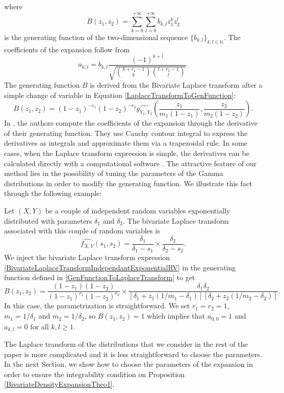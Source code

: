 where
\begin{equation}\label{CoefficientGeneratingFunction}
B(z_{1},z_{2})=\sum_{k=0}^{+\infty}\sum_{l=0}^{+\infty}b_{k,l}z_{1}^{k}z_{2}^{l}
\end{equation}
is the generating function of the two-dimensional sequence $\{b_{k,l}\}_{k,l\in\mathbb{N}}$. The coefficients of the expansion follow from 
\begin{equation}
a_{k,l}=b_{k,l}\frac{(-1)^{k+l}}{\sqrt{\binom{k+r_{1}-1}{k}\binom{l+r_{2}-1}{l}}}.
\end{equation}
The generating function $B$ is derived from the Bivariate Laplace transform after a simple change of variable in Equation \eqref{LaplaceTransformToGenFunction}:
\begin{equation}\label{GenFunctionToLaplaceTransform}
B(z_{1},z_{2})=(1-z_{1})^{-r_{1}}(1-z_{2})^{-r_{2}}\widehat{g_{Y_{1},Y_{2}}}\left(\frac{z_{1}}{m_{1}(1-z_{1})},\frac{z_{2}}{m_{2}(1-z_{2})}\right).
\end{equation} 
In \citet{AbChWh98}, the authors compute the coefficients of the expansion through the derivative of their generating function. They use Cauchy contour integral to express the derivatives as integrals and  approximate them via a trapezoidal rule. In some cases, when the Laplace transform expression is simple, the derivatives can be calculated directly with a computational software . The attractive feature of our method lies in the possibility of tuning the parameters of the Gamma distributions in order to modify the generating function. We illustrate this fact through the following example:
\begin{Ex}
Let $(X,Y)$ be a couple of independent random variables exponentially distributed with parameters $\delta_{1}$ and $\delta_{2}$. The bivariate Laplace transform associated with this couple of random variables is 
\begin{equation}\label{BivariateLaplaceTransformIndependantExponentialRV}
\widehat{f_{X,Y}}(s_{1},s_{2})=\frac{\delta_{1}}{\delta_{1}-s_{1}}\times\frac{\delta_{2}}{\delta_{2}-s_{2}}.
\end{equation}
We inject the bivariate Laplace transform expression \eqref{BivariateLaplaceTransformIndependantExponentialRV} in the generating function defined in \eqref{GenFunctionToLaplaceTransform} to get
\begin{equation}\label{CoefficientGeneratingFunctionIndependantExponentialRV}
B(z_{1},z_{2})=\frac{(1-z_{1})(1-z_{2})}{(1-z_{1})^{r_{1}}(1-z_{2})^{r_{2}}}\times\frac{\delta_{1}\delta_{2}}{\left[\delta_{1}+z_{1}(1/m_{1}-\delta_{1})\right]\left[\delta_{2}+z_{2}(1/m_{2}-\delta_{2})\right]}.
\end{equation}
In this case, the parametrization is straightforward. We set $r_{1}=r_{2}=1$, $m_{1}=1/\delta_{1}$ and $m_{2}=1/\delta_{2}$, so $B(z_{1},z_{2})=1$ which implies that $a_{0,0}=1$ and $a_{k,l}=0$ for all $k,l\geq1$.
\end{Ex} 
The Laplace transform of the distributions that we consider in the rest of the paper is more complicated and it is less straightforward to choose the parameters. In the next Section, we show how to choose the parameters of the expansion in order to ensure the integrability condition on Proposition \ref{BivariateDensityExpansionTheo1}.
